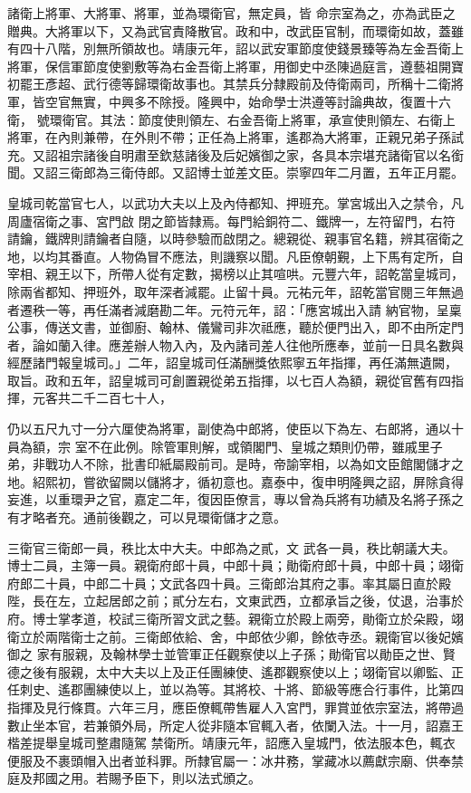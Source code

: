 \begin{pinyinscope}
 諸衛上將軍、大將軍、將軍，並為環衛官，無定員，皆
 命宗室為之，亦為武臣之贈典。大將軍以下，又為武官責降散官。政和中，改武臣官制，而環衛如故，蓋雖有四十八階，別無所領故也。靖康元年，詔以武安軍節度使錢景臻等為左金吾衛上將軍，保信軍節度使劉敷等為右金吾衛上將軍，用御史中丞陳過庭言，遵藝祖開寶初罷王彥超、武行德等歸環衛故事也。其禁兵分隸殿前及侍衛兩司，所稱十二衛將軍，皆空官無實，中興多不除授。隆興中，始命學士洪遵等討論典故，復置十六衛，
 號環衛官。其法：節度使則領左、右金吾衛上將軍，承宣使則領左、右衛上將軍，在內則兼帶，在外則不帶；正任為上將軍，遙郡為大將軍，正親兄弟子孫試充。又詔祖宗諸後自明肅至欽慈諸後及后妃嬪御之家，各具本宗堪充諸衛官以名銜聞。又詔三衛郎為三衛侍郎。又詔博士並差文臣。崇寧四年二月置，五年正月罷。



 皇城司乾當官七人，以武功大夫以上及內侍都知、押班充。掌宮城出入之禁令，凡周廬宿衛之事、宮門啟
 閉之節皆隸焉。每門給銅符二、鐵牌一，左符留門，右符請鑰，鐵牌則請鑰者自隨，以時參驗而啟閉之。總親從、親事官名籍，辨其宿衛之地，以均其番直。人物偽冒不應法，則譏察以聞。凡臣僚朝覲，上下馬有定所，自宰相、親王以下，所帶人從有定數，揭榜以止其喧哄。元豐六年，詔乾當皇城司，除兩省都知、押班外，取年深者減罷。止留十員。元祐元年，詔乾當官閱三年無過者遷秩一等，再任滿者減磨勘二年。元符元年，詔：「應宮城出入請
 納官物，呈稟公事，傳送文書，並御廚、翰林、儀鸞司非次祗應，聽於便門出入，即不由所定門者，論如蘭入律。應差辦人物入內，及內諸司差人往他所應奉，並前一日具名數與經歷諸門報皇城司。」二年，詔皇城司任滿酬獎依熙寧五年指揮，再任滿無遺闕，取旨。政和五年，詔皇城司可創置親從弟五指揮，以七百人為額，親從官舊有四指揮，元客共二千二百七十人，



 仍以五尺九寸一分六厘使為將軍，副使為中郎將，使臣以下為左、右郎將，通以十員為額，宗
 室不在此例。除管軍則解，或領閣門、皇城之類則仍帶，雖戚里子弟，非戰功人不除，批書印紙屬殿前司。是時，帝諭宰相，以為如文臣館閣儲才之地。紹熙初，嘗欲留闕以儲將才，循初意也。嘉泰中，復申明隆興之詔，屏除貪得妄進，以重環尹之官，嘉定二年，復因臣僚言，專以曾為兵將有功績及名將子孫之有才略者充。通前後觀之，可以見環衛儲才之意。



 三衛官三衛郎一員，秩比太中大夫。中郎為之貳，文
 武各一員，秩比朝議大夫。博士二員，主簿一員。親衛府郎十員，中郎十員；勛衛府郎十員，中郎十員；翊衛府郎二十員，中郎二十員；文武各四十員。三衛郎治其府之事。率其屬日直於殿陛，長在左，立起居郎之前；貳分左右，文東武西，立都承旨之後，仗退，治事於府。博士掌孝道，校試三衛所習文武之藝。親衛立於殿上兩旁，勛衛立於朵殿，翊衛立於兩階衛士之前。三衛郎依給、舍，中郎依少卿，餘依寺丞。親衛官以後妃嬪御之
 家有服親，及翰林學士並管軍正任觀察使以上子孫；勛衛官以勛臣之世、賢德之後有服親，太中大夫以上及正任團練使、遙郡觀察使以上；翊衛官以卿監、正任刺史、遙郡團練使以上，並以為等。其將校、十將、節級等應合行事件，比第四指揮及見行條貫。六年三月，應臣僚輒帶售雇人入宮門，罪賞並依宗室法，將帶過數止坐本官，若兼領外局，所定人從非隨本官輒入者，依闌入法。十一月，詔嘉王楷差提舉皇城司整肅隨駕
 禁衛所。靖康元年，詔應入皇城門，依法服本色，輒衣便服及不裹頭帽入出者並科罪。所隸官屬一：冰井務，掌藏冰以薦獻宗廟、供奉禁庭及邦國之用。若賜予臣下，則以法式頒之。




\end{pinyinscope}
